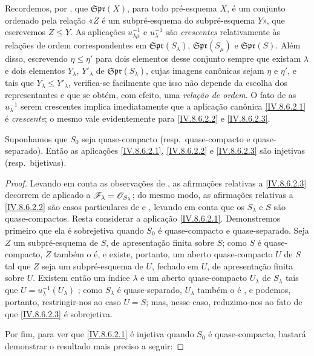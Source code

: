 
Recordemos, por , que $\mathfrak{Spr}(X)$, para todo pré-esquema $X$, é um conjunto ordenado pela relação «$Z$ é um subpré-esquema do subpré-esquema $Y$», que escrevemos $Z\leqslant Y$.
As aplicações $u_{\lambda\mu}^{-1}$ e $u_\lambda^{-1}$ são \emph{crescentes} relativamente às relações de ordem correspondentes em $\mathfrak{Spr}(S_\lambda)$, $\mathfrak{Spr}(S_\mu)$ e $\mathfrak{Spr}(S)$.
Além disso, escrevendo $\eta\leqslant\eta'$ para dois elementos desse conjunto sempre que existam $\lambda$ e dois elementos $Y_\lambda$, $Y'_\lambda$ de $\mathfrak{Spr}(S_\lambda)$, cujas imagens canônicas sejam $\eta$ e $\eta'$, e tais que $Y_\lambda\leqslant Y'_\lambda$, verifica-se facilmente que isso não depende da escolha dos representantes e que se obtém, com efeito, uma \emph{relação de ordem}.
O fato de as $u_\lambda^{-1}$ serem crescentes implica imediatamente que a aplicação canônica \eqref{IV.8.6.2.1} é \emph{crescente}; o mesmo vale evidentemente para \eqref{IV.8.6.2.2} e \eqref{IV.8.6.2.3}.

\begin{proposition}[8.6.3]
\label{IV.8.6.3}
Suponhamos que $S_0$ seja quase-compacto (resp.\ quase-compacto e quase-separado).
Então as aplicações \eqref{IV.8.6.2.1}, \eqref{IV.8.6.2.2} e \eqref{IV.8.6.2.3} são injetivas (resp.\ bijetivas).
\end{proposition}

\begin{proof}
Levando em conta as observações de , as afirmações relativas a \eqref{IV.8.6.2.3} decorrem de  aplicado a $\mathscr{F}_\lambda=\mathscr{O}_{S_\lambda}$; do mesmo modo, as afirmações relativas a \eqref{IV.8.6.2.2} são casos particulares de  e , levando em conta que os $S_\lambda$ e $S$ são quase-compactos.
Resta considerar a aplicação \eqref{IV.8.6.2.1}.
Demonstremos primeiro que ela é sobrejetiva quando $S_0$ é quase-compacto e quase-separado.
Seja $Z$ um subpré-esquema de $S$, de apresentação finita sobre $S$; como $S$ é quase-compacto, $Z$ também o é, e existe, portanto, um aberto quase-compacto $U$ de $S$ tal que $Z$ seja um subpré-esquema de $U$, fechado em $U$, de apresentação finita sobre $U$.
Existem então um índice $\lambda$ e um aberto quase-compacto $U_\lambda$ de $S_\lambda$ tais que $U=u_\lambda^{-1}(U_\lambda)$ ; como $S_\lambda$ é quase-separado, $U_\lambda$ também o é , e podemos, portanto, restringir-nos ao caso $U=S$; mas, nesse caso, reduzimo-nos ao fato de que \eqref{IV.8.6.2.3} é sobrejetiva.

Por fim, para ver que \eqref{IV.8.6.2.1} é injetiva quando $S_0$ é quase-compacto, bastará demonstrar o resultado mais preciso a seguir:
\end{proof}

